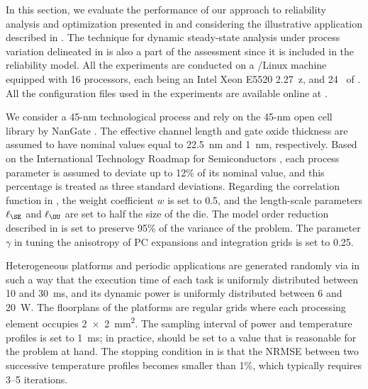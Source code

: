 In this section, we evaluate the performance of our approach to reliability
analysis and optimization presented in  and
 considering the illustrative application
described in . The technique for dynamic
steady-state analysis under process variation delineated in
 is also a part of the assessment
since it is included in the reliability model. All the experiments are conducted
on a /Linux machine equipped with 16 processors, each being an Intel
Xeon E5520 2.27~z, and 24~ of . All the configuration
files used in the experiments are available online at \cite{eslab2015}.

We consider a 45-nm technological process and rely on the 45-nm open cell
library by NanGate \cite{nangate}. The effective channel length and gate oxide
thickness are assumed to have nominal values equal to 22.5~nm and 1~nm,
respectively. Based on the International Technology Roadmap for Semiconductors
\cite{itrs}, each process parameter is assumed to deviate up to 12\% of its
nominal value, and this percentage is treated as three standard deviations.
Regarding the correlation function in , the weight
coefficient $w$ is set to 0.5, and the length-scale parameters $\ell_\SE$ and
$\ell_\OU$ are set to half the size of the die. The model order reduction
described in  is set to preserve 95\% of the
variance of the problem. The parameter $\gamma$ in
 tuning the anisotropy of \ac{PC} expansions and
integration grids is set to 0.25.

Heterogeneous platforms and periodic applications are generated randomly via
 \cite{dick1998} in such a way that the execution time of each task is
uniformly distributed between 10 and 30~ms, and its dynamic power is uniformly
distributed between 6 and 20~W. The floorplans of the platforms are regular
grids where each processing element occupies 2~×~2~mm\textsuperscript{2}. The
sampling interval \dt of power and temperature profiles is set to 1~ms; in
practice, \dt should be set to a value that is reasonable for the problem at
hand. The stopping condition in  is
that the \ac{NRMSE} between two successive temperature profiles becomes smaller
than 1\%, which typically requires 3--5 iterations.


